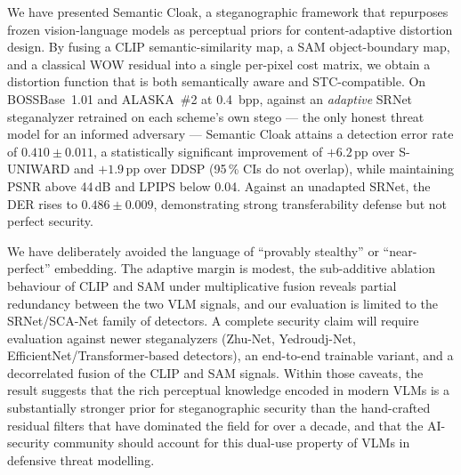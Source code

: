 \documentclass[10pt,a4paper]{article}
\begin{document}
We have presented Semantic Cloak, a steganographic framework that
repurposes frozen vision-language models as perceptual priors for
content-adaptive distortion design. By fusing a CLIP semantic-similarity
map, a SAM object-boundary map, and a classical WOW residual into a
single per-pixel cost matrix, we obtain a distortion function that is
both semantically aware and STC-compatible. On BOSSBase~1.01 and
ALASKA~\#2 at 0.4~bpp, against an \emph{adaptive} SRNet steganalyzer
retrained on each scheme's own stego --- the only honest threat model
for an informed adversary --- Semantic Cloak attains a detection error
rate of $0.410 \pm 0.011$, a statistically significant improvement of
$+6.2$\,pp over S-UNIWARD and $+1.9$\,pp over DDSP (95\,\% CIs do not
overlap), while maintaining PSNR above 44\,dB and LPIPS below 0.04.
Against an unadapted SRNet, the DER rises to $0.486 \pm 0.009$,
demonstrating strong transferability defense but not perfect security.

We have deliberately avoided the language of ``provably stealthy'' or
``near-perfect'' embedding. The adaptive margin is modest, the
sub-additive ablation behaviour of CLIP and SAM under multiplicative
fusion reveals partial redundancy between the two VLM signals, and our
evaluation is limited to the SRNet/SCA-Net family of detectors. A
complete security claim will require evaluation against newer
steganalyzers (Zhu-Net, Yedroudj-Net, EfficientNet/Transformer-based
detectors), an end-to-end trainable variant, and a decorrelated fusion
of the CLIP and SAM signals. Within those caveats, the result suggests
that the rich perceptual knowledge encoded in modern VLMs is a
substantially stronger prior for steganographic security than the
hand-crafted residual filters that have dominated the field for over a
decade, and that the AI-security community should account for this
dual-use property of VLMs in defensive threat modelling.


\renewcommand{\refname}{References}
\end{document}
